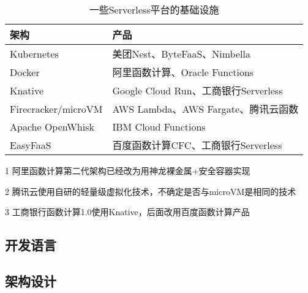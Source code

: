 \begin{table}[h!]
\centering
\begin{threeparttable}
    \begin{tabularx}{\textwidth}{|l|X|}
        \toprule
        \textbf{架构} & \textbf{产品} \\
        \midrule
        Kubernetes & 美团Nest\cite{meituan_serverless_nest, meituan_serverless_2}、ByteFaaS\cite{bytedance_faas}、Nimbella\cite{nimbella_k8s} \\
        \hline
        Docker & 阿里函数计算\cite{aliyun_faas_arch_2}\tnote{1}、Oracle Functions\cite{overview_oracle_functions} \\
        \hline
        Knative & Google Cloud Run\cite{gcr_knative}、工商银行Serverless\cite{icbc_faas_arch}\tnote{1}  \\
        \hline
        Firecracker/microVM & AWS Lambda、AWS Fargate\cite{firecracker_home}、腾讯云函数\cite{tecent_faas_cold_start, tecent_serverless}\tnote{2} \\
        \hline
        Apache OpenWhisk & IBM Cloud Functions\cite{how_ibm_cloud_functions_works} \\
        \hline
        EasyFaaS & 百度函数计算CFC\cite{baidu_serverless_arch}、工商银行Serverless\cite{icbc_faas_arch} \\
        \bottomrule
    \end{tabularx}
\begin{tablenotes}
    \item[1] 阿里函数计算第二代架构已经改为用神龙裸金属+安全容器实现\cite{aliyun_faas_arch_2}
    \item[2] 腾讯云使用自研的轻量级虚拟化技术，不确定是否与microVM是相同的技术
    \item[3] 工商银行函数计算1.0使用Knative，后面改用百度函数计算产品
    \end{tablenotes}
\end{threeparttable}
\caption{一些Serverless平台的基础设施}
\label{table:serverless-infras}
\end{table}
\subsection{开发语言}
\subsection{架构设计}